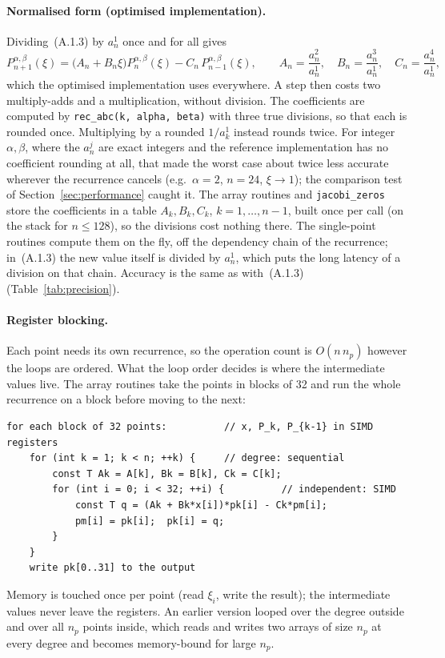 \documentclass[11pt,a4paper]{article}
\newcommand{\Pab}[1]{P_{#1}^{\alpha,\beta}}     %
\newcommand{\code}[1]{\texttt{#1}}
\begin{document}
\paragraph{Normalised form (optimised implementation).}
Dividing~(A.1.3) by $a_n^1$ once and for all gives
\begin{equation}
  \Pab{n+1}(\xi) = \bigl(A_n + B_n\xi\bigr)\Pab{n}(\xi) - C_n\,\Pab{n-1}(\xi),
  \qquad
  A_n = \frac{a_n^2}{a_n^1},\quad B_n = \frac{a_n^3}{a_n^1},\quad C_n = \frac{a_n^4}{a_n^1},
  \tag{A.1.3$'$}
\end{equation}
which the optimised implementation uses everywhere. A step then costs two
multiply-adds and a multiplication, without division. The coefficients are
computed by \code{rec\_abc(k, alpha, beta)} with three true divisions, so that
each is rounded once. Multiplying by a rounded $1/a_k^1$ instead rounds twice.
For integer $\alpha,\beta$, where the $a_n^j$ are exact integers and the
reference implementation has no coefficient rounding at all, that made the
worst case about twice less accurate wherever the recurrence cancels (e.g.\
$\alpha=2$, $n=24$, $\xi\to1$); the comparison test of
Section~\ref{sec:performance} caught it. The array routines and
\code{jacobi\_zeros} store the coefficients in a table $A_k,B_k,C_k$,
$k=1,\dots,n-1$, built once per call (on the stack for $n\le128$), so the
divisions cost nothing there. The single-point routines compute them on the
fly, off the dependency chain of the recurrence; in~(A.1.3) the new value
itself is divided by $a_n^1$, which puts the long latency of a division on
that chain. Accuracy is the same as with~(A.1.3)
(Table~\ref{tab:precision}).

\paragraph{Register blocking.}
Each point needs its own recurrence, so the operation count is $O(n\,n_p)$
however the loops are ordered. What the loop order decides is where the
intermediate values live. The array routines take the points in blocks of 32
and run the whole recurrence on a block before moving to the next:
\begin{lstlisting}
for each block of 32 points:          // x, P_k, P_{k-1} in SIMD registers
    for (int k = 1; k < n; ++k) {     // degree: sequential
        const T Ak = A[k], Bk = B[k], Ck = C[k];
        for (int i = 0; i < 32; ++i) {          // independent: SIMD
            const T q = (Ak + Bk*x[i])*pk[i] - Ck*pm[i];
            pm[i] = pk[i];  pk[i] = q;
        }
    }
    write pk[0..31] to the output
\end{lstlisting}
Memory is touched once per point (read $\xi_i$, write the result); the
intermediate values never leave the registers. An earlier version looped over
the degree outside and over all $n_p$ points inside, which reads and writes
two arrays of size $n_p$ at every degree and becomes memory-bound for large
$n_p$.
\end{document}
